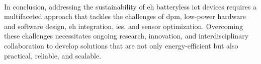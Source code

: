     \paragraph{}
    In conclusion, addressing the sustainability of \gls{eh} batteryless \gls{iot} devices requires a multifaceted approach that tackles the challenges of \gls{dpm}, low-power hardware and software design, \gls{eh} integration, \gls{ies}, and sensor optimization. Overcoming these challenges necessitates ongoing research, innovation, and interdisciplinary collaboration to develop solutions that are not only energy-efficient but also practical, reliable, and scalable.